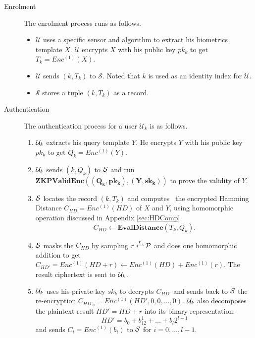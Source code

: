 \begin{description}
\begin{itemize}
	\end{itemize}
	\item[Enrolment] The enrolment process runs as follows.
	\begin{itemize}
		\item $\mathcal{U}$ uses a specific sensor and algorithm to
		extract his biometrics template $X$. $\mathcal{U}$
		encrypts $X$ with his public key $pk_k$ to get
		$T_k = Enc^{(1)}(X)$.
		\item $\mathcal{U}$ sends $(k,T_k)$ to $\mathcal{S}$.
		Noted that $k$
		is used as an identity index for $\mathcal{U}$.
		\item $\mathcal{S}$ stores a tuple $(k, T_k)$ as a
		record.
	\end{itemize}
	\item[Authentication] The authentication process for a user
	$\mathcal{U}_k$ is as follows.
	\begin{enumerate}
		\item $\mathcal{U}_k$ extracts his query template $Y$. He
		encrypts $Y$ with his public key $pk_k$ to get
		$Q_k = Enc^{(1)}(Y)$.\label{protocol:step1}
		\item $\mathcal{U}_k$ sends $(k,Q_k)$ to $\mathcal{S}$ and
		run $\mathbf{ZKPValidEnc((Q_k,pk_k),(Y,sk_k))}$ to prove the
		validity of $Y$.\label{protocol:step2}
		\item $\mathcal{S}$ locates the record $(k,T_k)$ and computes
		\                        the encrypted Hamming Distance $C_{HD} = Enc^{(1)}(
		HD)$ of $X$ and
		$Y$, using homomorphic operation discussed in
		Appendix \ref{sec:HDComp}
		$$C_{HD} \gets
		\textbf{EvalDistance}(T_k,Q_k).$$\label{protocol:step3}
		\item $\mathcal{S}$ masks the $C_{HD}$ by sampling $r
		\stackrel{r}{\hookleftarrow} \mathcal{P}$
		and does one homomorphic addition to get
		$C_{HD'} = Enc^{(1)}(HD + r) \gets Enc^{(1)}(HD) + Enc^{(1)}(r)$.
		The result ciphertext is sent to $\mathcal{U}_k$.\label{protocol:step4}
		\item $\mathcal{U}_k$ uses his private key $sk_k$ to decrypts $C_{HD'}$
		and sends back to $\mathcal{S}$
		the re-encryption $C_{HD'_0} = Enc^{(1)}(HD',0,0,\dots,0)$.
		$\mathcal{U}_k$ also decomposes the plaintext result
		$HD' = HD+r$ into its binary representation:
		\[
		HD' = b_0 + b_12^1 + \dots + b_l2^{l-1}
		\]
		and sends $C_i = Enc^{(1)}(b_i)$ to $\mathcal{S}$
		for $i = 0, \dots, l-1$.\label{protocol:step5}


\end{enumerate}
\end{description}
